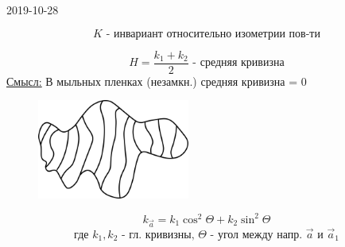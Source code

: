 \documentclass[main]{subfiles}
\begin{document}
\begin{lect}{2019-10-28}
      \begin{Utv}
          \[K \text{ - инвариант относительно изометрии пов-ти}\]
      \end{Utv}

      \begin{Definition}
          \[H = \frac{k_1 + k_2}{2} \text{ - средняя кривизна}\]
          \ul{Смысл:} В мыльных пленках (незамкн.) средняя кривизна = 0
          \begin{figure}[H]
              \includegraphics[width=5cm]{pics/8_5.png}
              \centering
          \end{figure}

      \end{Definition}

      \begin{Theorem}[Эйлера]
          \[k_{\vec{a}} = k_1 \cos^2 \Theta + k_2 \sin^2\Theta \]
          \[\text{где } k_1, k_2 \text{ - гл. кривизны, } \Theta \text{ - угол между
          напр. } \vec{a} \text{ и } \vec{a}_1\]
      \end{Theorem}


\end{lect}
\end{document}
